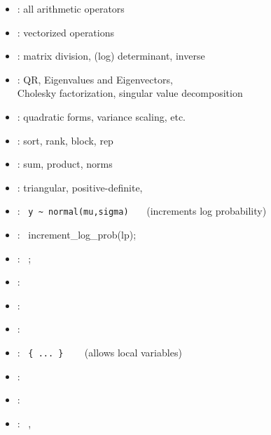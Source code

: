 \documentclass[10pt]{report}
\begin{document}
%
\begin{itemize}\small
\item {}: all arithmetic operators
\item {}: vectorized operations
\item {}: matrix division, (log) determinant,
  inverse
\item {}: QR, Eigenvalues and Eigenvectors,
  \\
  Cholesky factorization, singular value decomposition
\item {}: quadratic forms, variance scaling, etc.
\item {}: sort, rank, block, rep
\item {}: sum, product, norms
\item {}: triangular, positive-definite,
\end{itemize}


%
\vspace*{-4pt}
\begin{itemize}
\item {}: \ {\footnotesize \Verb|y ~ normal(mu,sigma)|}
  \ \ \ {\footnotesize (increments log probability)}
\item {}: \ {\footnotesize increment\_log\_prob(lp);}
\item {}: \  {\footnotesize {};}
\item {}: \ {\footnotesize {}}
\item {}: \ {\footnotesize {}}
\item {}: \ {\footnotesize
    }
\item {}: \ {\footnotesize \Verb|{ ... }|}  \ \ \ {\footnotesize
    (allows local variables)}
\item {}: \ {\footnotesize {}}
\item {}:
\ {\footnotesize
    }
\item {}: \ {\footnotesize {}, }
\end{itemize}
\end{document}
